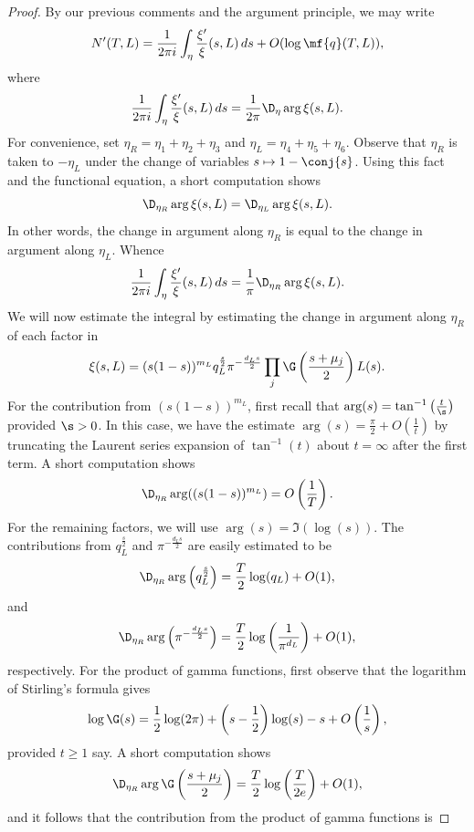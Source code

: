 \documentclass[12pt]{article}
\begin{document}
\begin{proof}
        \noindent By our previous comments and the argument principle, we may write
        \[
          N'(T,L) = \frac{1}{2\pi i}\int_{\eta}\frac{\xi'}{\xi}(s,L)\,ds+O(\log{\mf{q}(T,L)}),
        \]
        where
        \[
          \frac{1}{2\pi i}\int_{\eta}\frac{\xi'}{\xi}(s,L)\,ds = \frac{1}{2\pi}\D_{\eta}\arg\xi(s,L).
        \]
        For convenience, set \(\eta_{R} = \eta_{1}+\eta_{2}+\eta_{3}\) and \(\eta_{L} = \eta_{4}+\eta_{5}+\eta_{6}\). Observe that \(\eta_{R}\) is taken to \(-\eta_{L}\) under the change of variables \(s \mapsto 1-\conj{s}\). Using this fact and the functional equation, a short computation shows 
        \[
          \D_{\eta_{R}}\arg\xi(s,L) = \D_{\eta_{L}}\arg\xi(s,L).
        \]
        In other words, the change in argument along \(\eta_{R}\) is equal to the change in argument along \(\eta_{L}\). Whence
        \[
          \frac{1}{2\pi i}\int_{\eta}\frac{\xi'}{\xi}(s,L)\,ds = \frac{1}{\pi}\D_{\eta_{R}}\arg\xi(s,L).
        \]
        We will now estimate the integral by estimating the change in argument along \(\eta_{R}\) of each factor in
        \[
          \xi(s,L) = (s(1-s))^{m_{L}}q_{L}^{\frac{s}{2}}\pi^{-\frac{d_{L}s}{2}}\prod_{j}\G\left(\frac{s+\mu_{j}}{2}\right)L(s).
        \]
        For the contribution from \((s(1-s))^{m_{L}}\), first recall that \(\arg(s) = \tan^{-1}\left(\frac{t}{\s}\right)\) provided \(\s > 0\). In this case, we have the estimate \(\arg(s) = \frac{\pi}{2}+O\left(\frac{1}{t}\right)\) by truncating the Laurent series expansion of \(\tan^{-1}(t)\) about \(t = \infty\) after the first term. A short computation shows
        \[
          \D_{\eta_{R}}\arg((s(1-s))^{m_{L}}) = O\left(\frac{1}{T}\right).
        \]
        For the remaining factors, we will use \(\arg(s) = \Im(\log(s))\). The contributions from \(q_{L}^{\frac{s}{2}}\) and \(\pi^{-\frac{d_{L}s}{2}}\) are easily estimated to be
        \[
          \D_{\eta_{R}}\arg\left(q_{L}^{\frac{s}{2}}\right) = \frac{T}{2}\log(q_{L})+O(1),
        \]
        and
        \[
          \D_{\eta_{R}}\arg\left(\pi^{-\frac{d_{L}s}{2}}\right) = \frac{T}{2}\log\left(\frac{1}{\pi^{d_{L}}}\right)+O(1),
        \]
        respectively. For the product of gamma functions, first observe that the logarithm of Stirling's formula gives
        \[
          \log\G(s) = \frac{1}{2}\log(2\pi)+\left(s-\frac{1}{2}\right)\log(s)-s+O\left(\frac{1}{s}\right),
        \]
        provided \(t \ge 1\) say. A short computation shows
        \[
          \D_{\eta_{R}}\arg\G\left(\frac{s+\mu_{j}}{2}\right) = \frac{T}{2}\log\left(\frac{T}{2e}\right)+O(1),
        \]
        and it follows that the contribution from the product of gamma functions is

\end{proof}
\end{document}
